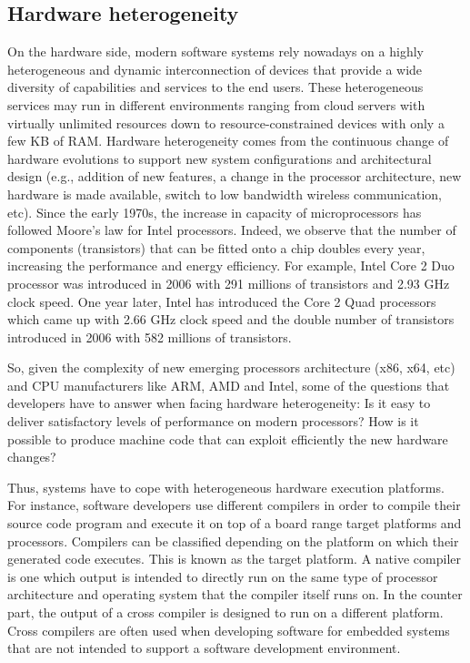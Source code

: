 \subsection{Hardware heterogeneity}
On the hardware side, modern software systems rely nowadays on a highly heterogeneous and dynamic interconnection of devices that provide a wide diversity of capabilities and services to the end users.
These heterogeneous services may run in different environments ranging from cloud servers with virtually unlimited resources down to resource-constrained devices with only a few KB of RAM.
Hardware heterogeneity comes from the continuous change of hardware evolutions to support new system configurations and architectural design (e.g., addition of new features, a change in the processor architecture, new hardware is made available, switch to low bandwidth wireless communication, etc). 
Since the early 1970s, the increase in capacity of microprocessors has followed Moore's law for Intel processors. Indeed, we observe that the number of components (transistors) that can be fitted onto a chip doubles every year, increasing the performance and energy efficiency.
For example, Intel Core 2 Duo processor was introduced in 2006 with 291 millions of transistors and 2.93 GHz clock speed. One year later, Intel has introduced the Core 2 Quad processors which came up with 2.66 GHz clock speed and the double number of transistors introduced in 2006 with 582 millions of transistors.

So, given the complexity of new emerging processors architecture (x86, x64, etc) and CPU manufacturers like ARM, AMD and Intel, some of the questions that developers have to answer when facing hardware heterogeneity: 
Is it easy to deliver satisfactory levels of performance on modern processors? How is it possible to produce machine code that can exploit efficiently the new hardware changes? 

Thus, systems have to cope with heterogeneous hardware execution platforms.
For instance, software developers use different compilers in order to compile their source code program and execute it on top of a board range target platforms and processors. 
Compilers can be classified depending on the platform on which their generated code executes. This is known as the target platform.
A native compiler is one which output is intended to directly run on the same type of processor architecture and operating system that the compiler itself runs on. In the counter part, the output of a cross compiler is designed to run on a different platform. Cross compilers are often used when developing software for embedded systems that are not intended to support a software development environment.

